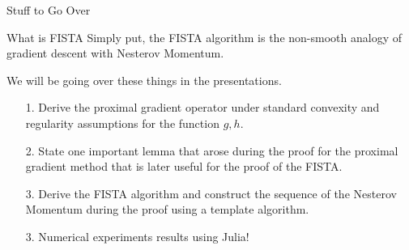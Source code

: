 \documentclass[11pt]{beamer}
\begin{document}
        \begin{frame}{Stuff to Go Over}
            \begin{block}{What is FISTA}
                Simply put, the FISTA algorithm is the non-smooth analogy of gradient descent with Nesterov Momentum.     
            \end{block}
            We will be going over these things in the presentations. 
            \begin{itemize}
                \item [1.] Derive the proximal gradient operator under standard convexity and regularity assumptions for the function $g, h$. 
                \pause\item [2.] State one important lemma that arose during the proof for the proximal gradient method that is later useful for the proof of the FISTA. 
                \pause\item [3.] Derive the FISTA algorithm and construct the sequence of the Nesterov Momentum during the proof using a template algorithm. 
                \pause\item [3.] Numerical experiments results using Julia! 
            \end{itemize}
        \end{frame}
\end{document}
